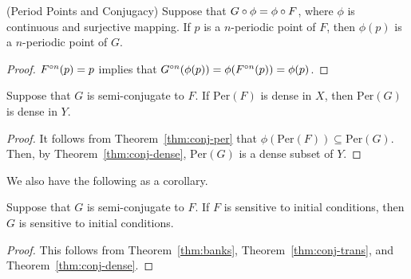 \documentclass[12pt,draft,twoside]{book}
\begin{document}
  \begin{theorem}
    (Period Points and Conjugacy)
    Suppose that $G \circ \phi = \phi \circ F$, where $\phi$ is continuous and surjective mapping.
    If $p$ is a $n$-periodic point of $F$, then $\phi(p)$ is a $n$-periodic point of $G$.
    \label{thm:conj-per}
    \begin{proof}
      $F^{\circ n}(p) = p$ implies that $G^{\circ n}(\phi(p)) = \phi(F^{\circ n}(p)) = \phi(p)$.
    \end{proof}
  \end{theorem}

\begin{corollary}
    Suppose that $G$ is semi-conjugate to $F$.
    If $\mathrm{Per}(F)$ is dense in $X$, then $\mathrm{Per}(G)$ is dense in $Y$.
    \label{cor:conj-dense-per}
    \begin{proof}
      It follows from Theorem~\ref{thm:conj-per} that $\phi(\mathrm{Per}(F)) \subseteq \mathrm{Per}(G)$.
      Then, by Theorem~\ref{thm:conj-dense}, $\mathrm{Per}(G)$ is a dense subset of $Y$.
    \end{proof}
\end{corollary}
We also have the following as a corollary.
\begin{corollary}
  Suppose that $G$ is semi-conjugate to $F$.
  If $F$ is sensitive to initial conditions, then $G$ is sensitive to initial conditions.
  \label{cor:conj-sdic}
  \begin{proof}
  This follows from Theorem~\ref{thm:banks}, Theorem~\ref{thm:conj-trans}, and Theorem~\ref{thm:conj-dense}.
  \end{proof}
\end{corollary}





\printindex
\end{document}
